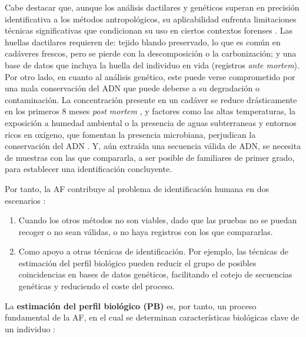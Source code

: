 Cabe destacar que, aunque los análisis dactilares y genéticos superan en precisión identificativa a los 
métodos antropológicos, su aplicabilidad enfrenta limitaciones técnicas significativas que condicionan su uso 
en ciertos contextos forenses \cite{beauthier2009}.
Las huellas dactilares requieren de: tejido blando preservado, lo que es común en cadáveres frescos, pero se 
pierde con la descomposición o la carbonización; y una base de datos que incluya la huella del individuo en 
vida (registros \textit{ante mortem}). Por otro lado, en cuanto al análisis genético, este puede verse 
comprometido por una mala conservación del ADN que puede deberse a su degradación o contaminación. La 
concentración presente en un cadáver se reduce drásticamente en los primeros 8 meses \textit{post mortem} 
\cite{higgins2015}, y factores como las altas temperaturas, la exposición a humedad ambiental o la presencia 
de aguas subterraneas y entornos ricos en oxígeno, que fomentan la presencia microbiana, perjudican la 
conservación del ADN \cite{latham2018}. Y, aún extraída una secuencia válida de ADN, se necesita de muestras 
con las que compararla, a ser posible de familiares de primer grado, para establecer una identificación 
concluyente. 

Por tanto, la AF contribuye al problema de identificación humana en dos escenarios \cite{swganth2010}:  

\begin{enumerate}

    \item Cuando los otros métodos no son viables, dado que las pruebas no se puedan recoger o no sean 
    válidas, o no haya registros con los que compararlas.
    
    \item Como apoyo a otras técnicas de identificación. Por ejemplo, las técnicas de estimación del perfil 
    biológico pueden reducir el grupo de posibles coincidencias en bases de datos genéticos, facilitando el 
    cotejo de secuencias genéticas y reduciendo el coste del proceso.  

\end{enumerate}

La \textbf{estimación del perfil biológico (PB)} es, por tanto, un proceso fundamental de la AF, en el cual
se determinan características biológicas clave de un individuo \cite{byers2023}: 


